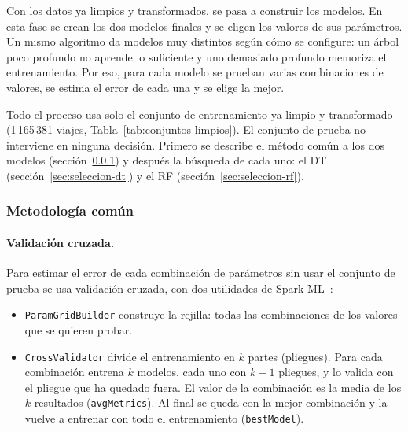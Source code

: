 \documentclass[12pt,a4paper]{article}
\begin{document}
Con los datos ya limpios y transformados, se pasa a construir los modelos.
En esta fase se crean los dos modelos finales y se eligen los valores de
sus parámetros. Un mismo algoritmo da modelos muy distintos según cómo se
configure: un árbol poco profundo no aprende lo suficiente y uno demasiado
profundo memoriza el entrenamiento. Por eso, para cada modelo se prueban
varias combinaciones de valores, se estima el error de cada una y se elige
la mejor.
 
Todo el proceso usa solo el conjunto de entrenamiento ya limpio y
transformado (1\,165\,381 viajes, Tabla~\ref{tab:conjuntos-limpios}). El
conjunto de prueba no interviene en ninguna decisión. Primero se describe el
método común a los dos modelos (sección~\ref{sec:metodologia}) y después la
búsqueda de cada uno: el \ac{DT} (sección~\ref{sec:seleccion-dt}) y el
\ac{RF} (sección~\ref{sec:seleccion-rf}).
 
 
\subsubsection{Metodología común}
\label{sec:metodologia}
 
\paragraph{Validación cruzada.} Para estimar el error de cada combinación
de parámetros sin usar el conjunto de prueba se usa validación cruzada, con
dos utilidades de Spark ML~\cite{spark_tuning}:
\begin{itemize}
    \item \texttt{ParamGridBuilder} construye la rejilla: todas las
    combinaciones de los valores que se quieren probar.
    \item \texttt{CrossValidator} divide el entrenamiento en $k$ partes
    (pliegues). Para cada combinación entrena $k$ modelos, cada uno con
    $k-1$ pliegues, y lo valida con el pliegue que ha quedado fuera. El
    valor de la combinación es la media de los $k$ resultados
    (\texttt{avgMetrics}). Al final se queda con la mejor combinación y la
    vuelve a entrenar con todo el entrenamiento (\texttt{bestModel}).
\end{itemize}
 
\end{document}
